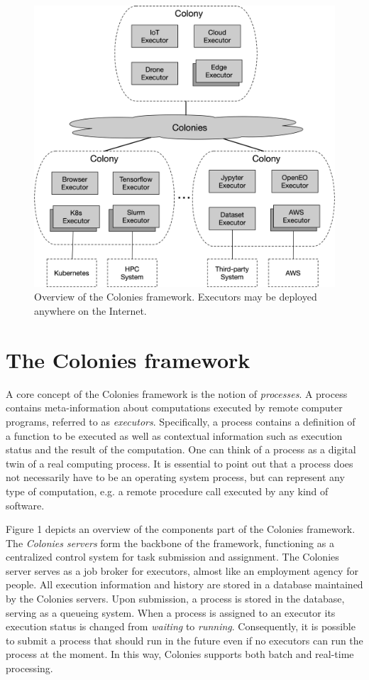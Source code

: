 \documentclass{article}
\begin{document}
\begin{figure}[t]
	\centering
    \includegraphics[scale=0.45]{overview.png}
	\caption{Overview of the Colonies framework. Executors may be deployed anywhere on the Internet.}
	\label{fig:overview}
\end{figure}

\section{The Colonies framework}
\label{sec:headings}
A core concept of the Colonies framework is the notion of \emph{processes}. A process contains meta-information about computations executed by remote computer programs, referred to as \emph{executors}. Specifically, a process contains a definition of a function to be executed as well as contextual information such as execution status and the result of the computation. One can think of a process as a digital twin of a real computing process. It is essential to point out that a process does not necessarily have to be an operating system process, but can represent any type of computation, e.g. a remote procedure call executed by any kind of software. 

Figure 1 depicts an overview of the components part of the Colonies framework. The \emph{Colonies servers} form the backbone of the framework, functioning as a centralized control system for task submission and assignment. The Colonies server serves as a job broker for executors, almost like an employment agency for people. All execution information and history are stored in a database maintained by the Colonies servers. Upon submission, a process is stored in the database, serving as a queueing system. When a process is assigned to an executor its execution status is changed from \emph{waiting} to \emph{running}. Consequently, it is possible to submit a process that should run in the future even if no executors can run the process at the moment. In this way, Colonies supports both batch and real-time processing. 
\end{document}
